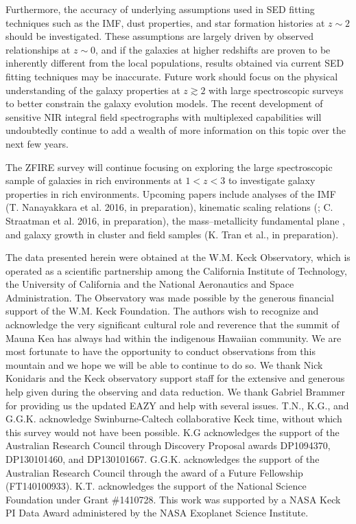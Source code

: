 \documentclass[iop]{emulateapj}
\begin{document}
Furthermore, the accuracy of underlying assumptions used in SED fitting techniques such as the IMF, dust properties, and star formation histories at $z\sim2$ should be investigated. These assumptions are largely driven by observed relationships at $z\sim0$, and if the galaxies at higher redshifts are proven to be inherently different from the local populations, results obtained via current SED fitting techniques may be inaccurate.  Future work should focus on the physical understanding of the galaxy properties at $z\gtrsim2$ with large spectroscopic surveys to better constrain the galaxy evolution models. The recent development of sensitive NIR integral field spectrographs with multiplexed capabilities will undoubtedly continue to add a wealth of more information on this topic over the next few years. 


The ZFIRE survey will continue focusing on exploring the large spectroscopic sample of galaxies in rich environments at $1<z<3$ to investigate galaxy properties in rich environments.  Upcoming papers
include analyses of the IMF (T. Nanayakkara et al. 2016, in preparation), kinematic scaling relations (\citet{Alcorn2016}; C. Straatman et al. 2016, in preparation), the mass--metallicity fundamental plane \citep{Kacprzak2016}, and galaxy growth in cluster and field samples (K. Tran et al., in preparation). 


\acknowledgements

The data presented herein were obtained
at the W.M. Keck Observatory, which is operated as a scientific
partnership among the California Institute of Technology, the
University of California and the National Aeronautics and Space
Administration. The Observatory was made possible by the generous
financial support of the W.M. Keck Foundation. 
The authors wish to recognize and acknowledge the very significant cultural role and
reverence that the summit of Mauna Kea has always had within the
indigenous Hawaiian community.  We are most fortunate to have the
opportunity to conduct observations from this mountain and we hope we
will be able to continue to do so.
We thank Nick Konidaris and the Keck observatory support staff for the
extensive and generous help given during the observing and data
reduction.  We thank Gabriel Brammer for providing us the updated EAZY
and help with several issues.  T.N., K.G., and G.G.K. acknowledge
Swinburne-Caltech collaborative Keck time, without which this survey
would not have been possible.  K.G acknowledges the support of the
Australian Research Council through Discovery Proposal awards
DP1094370, DP130101460, and DP130101667.  G.G.K. acknowledges the support
of the Australian Research Council through the award of a Future
Fellowship (FT140100933).  K.T. acknowledges the support of the
National Science Foundation under Grant \#1410728.  This work was
supported by a NASA Keck PI Data Award administered by the NASA
Exoplanet Science Institute.   
\end{document}
